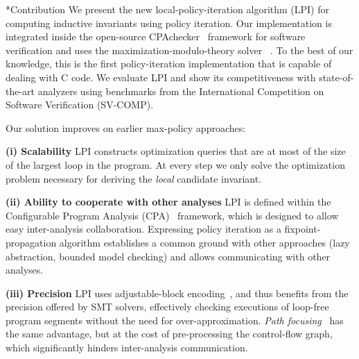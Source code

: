 \documentclass{llncs}
\makeatletter
\renewcommand{\paragraph}{\@startsection{paragraph}{4}{\z@}{0.8ex \@plus 0ex \@minus 1ex}{-1em}{\normalfont\normalsize\bfseries}}
\makeatother
\begin{document}
\paragraph*{Contribution}
We present the new local-policy-iteration algorithm (LPI) for
computing inductive invariants using policy iteration.
Our implementation is integrated inside the open-source
CPAchecker~\cite{cpachecker} framework for software verification
and uses the maximization-modulo-theory solver ~\cite{opt_z3}.
To the best of our knowledge, this is the first policy-iteration implementation
that is capable of dealing with C code.
We evaluate LPI and show its competitiveness with state-of-the-art analyzers
using benchmarks from the International Competition on Software Verification (SV-COMP).

Our solution improves on earlier max-policy approaches:

\noindent \textbf{(i) Scalability} LPI constructs optimization queries that are at most of
the size of the largest loop in the program.
At every step we only solve the optimization problem necessary for deriving the
\emph{local} candidate invariant.

\noindent \textbf{(ii) Ability to cooperate with other analyses}
LPI is defined within the Configurable Program Analysis (CPA)~\cite{cpa} framework,
which is designed to allow easy inter-analysis collaboration.
Expressing policy iteration as a fixpoint-propagation algorithm
establishes a common ground with other approaches (lazy abstraction, bounded
model checking) and allows communicating with other analyses.

\noindent \textbf{(iii) Precision} LPI uses adjustable-block
encoding~\cite{adjustable_block_encoding},
and thus benefits from the precision offered by SMT solvers,
effectively checking executions of loop-free program segments
without the need for over-approximation.
\emph{Path focusing}~\cite{policy_iteration_path_focusing} has the
same advantage, but at the cost of pre-processing the control-flow graph, which
significantly hinders inter-analysis communication.
\end{document}
